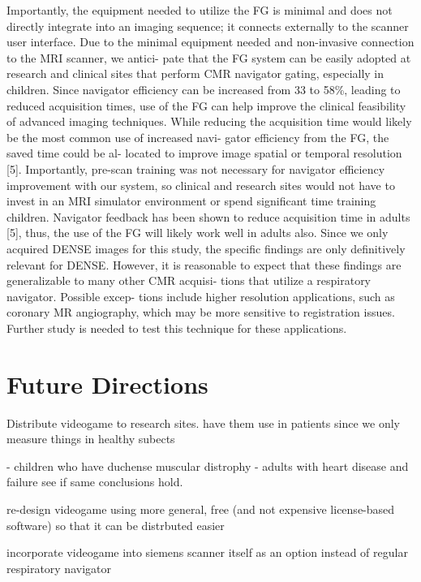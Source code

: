 	Importantly, the equipment needed to utilize the FG is minimal and does not directly integrate into an imaging sequence; it connects externally to the scanner user interface. Due to the minimal equipment needed and non-invasive connection to the MRI scanner, we antici- pate that the FG system can be easily adopted at research and clinical sites that perform CMR navigator gating, especially in children. Since navigator efficiency can be increased from 33 to 58\%, leading to reduced acquisition times, use of the FG can help improve the clinical feasibility of advanced imaging techniques. While reducing the acquisition time would likely be the most common use of increased navi- gator efficiency from the FG, the saved time could be al- located to improve image spatial or temporal resolution [5]. Importantly, pre-scan training was not necessary for navigator efficiency improvement with our system, so clinical and research sites would not have to invest in an MRI simulator environment or spend significant time training children. Navigator feedback has been shown to reduce acquisition time in adults [5], thus, the use of the FG will likely work well in adults also. Since we only acquired DENSE images for this study,
	the specific findings are only definitively relevant for DENSE. However, it is reasonable to expect that these findings are generalizable to many other CMR acquisi- tions that utilize a respiratory navigator. Possible excep- tions include higher resolution applications, such as coronary MR angiography, which may be more sensitive to registration issues. Further study is needed to test this technique for these applications.
	
\section{Future Directions}
	Distribute videogame to research sites. have them use in patients since we only measure things in healthy subects
	
	- children who have duchense muscular distrophy
	- adults with heart disease and failure
	see if same conclusions hold.
	
	re-design videogame using more general, free (and not expensive license-based software) so that it can be distrbuted easier
	
	incorporate videogame into siemens scanner itself as an option instead of regular respiratory navigator
	
	